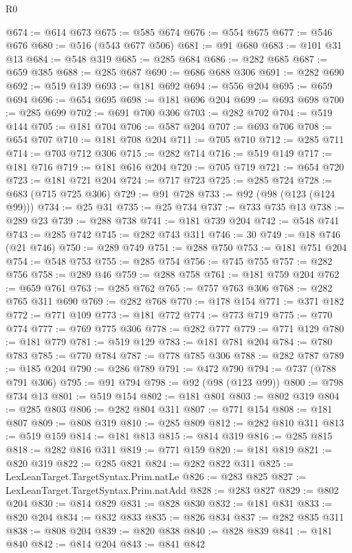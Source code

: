 \begin{lexlean}{R0}
\begin{coremodule}
@674 := @614 @673
@675 := @585 @674
@676 := @554 @675
@677 := @546 @676
@680 := @516 (@543 @677 @506)
@681 := @91 @680
@683 := @101 @31 @13
@684 := @548 @319
@685 := @285 @684
@686 := @282 @685
@687 := @659 @385
@688 := @285 @687
@690 := @686 @688 @306
@691 := @282 @690
@692 := @519 @139
@693 := @181 @692
@694 := @556 @204
@695 := @659 @694
@696 := @654 @695
@698 := @181 @696 @204
@699 := @693 @698
@700 := @285 @699
@702 := @691 @700 @306
@703 := @282 @702
@704 := @519 @144
@705 := @181 @704
@706 := @587 @204
@707 := @693 @706
@708 := @654 @707
@710 := @181 @708 @204
@711 := @705 @710
@712 := @285 @711
@714 := @703 @712 @306
@715 := @282 @714
@716 := @519 @149
@717 := @181 @716
@719 := @181 @616 @204
@720 := @705 @719
@721 := @654 @720
@723 := @181 @721 @204
@724 := @717 @723
@725 := @285 @724
@728 := @683 (@715 @725 @306)
@729 := @91 @728
@733 := @92 (@98 (@123 (@124 @99)))
@734 := @25 @31
@735 := @25 @734
@737 := @733 @735 @13
@738 := @289 @23
@739 := @288 @738
@741 := @181 @739 @204
@742 := @548 @741
@743 := @285 @742
@745 := @282 @743 @311
@746 := 30
@749 := @18 @746 (@21 @746)
@750 := @289 @749
@751 := @288 @750
@753 := @181 @751 @204
@754 := @548 @753
@755 := @285 @754
@756 := @745 @755
@757 := @282 @756
@758 := @289 @46
@759 := @288 @758
@761 := @181 @759 @204
@762 := @659 @761
@763 := @285 @762
@765 := @757 @763 @306
@768 := @282 @765 @311 @690
@769 := @282 @768
@770 := @178 @154
@771 := @371 @182
@772 := @771 @109
@773 := @181 @772
@774 := @773 @719
@775 := @770 @774
@777 := @769 @775 @306
@778 := @282 @777
@779 := @771 @129
@780 := @181 @779
@781 := @519 @129
@783 := @181 @781 @204
@784 := @780 @783
@785 := @770 @784
@787 := @778 @785 @306
@788 := @282 @787
@789 := @185 @204
@790 := @286 @789
@791 := @472 @790
@794 := @737 (@788 @791 @306)
@795 := @91 @794
@798 := @92 (@98 (@123 @99))
@800 := @798 @734 @13
@801 := @519 @154
@802 := @181 @801
@803 := @802 @319
@804 := @285 @803
@806 := @282 @804 @311
@807 := @771 @154
@808 := @181 @807
@809 := @808 @319
@810 := @285 @809
@812 := @282 @810 @311
@813 := @519 @159
@814 := @181 @813
@815 := @814 @319
@816 := @285 @815
@818 := @282 @816 @311
@819 := @771 @159
@820 := @181 @819
@821 := @820 @319
@822 := @285 @821
@824 := @282 @822 @311
@825 := LexLeanTarget.TargetSyntax.Prim.natLe
@826 := @283 @825
@827 := LexLeanTarget.TargetSyntax.Prim.natAdd
@828 := @283 @827
@829 := @802 @204
@830 := @814 @829
@831 := @828 @830
@832 := @181 @831
@833 := @820 @204
@834 := @832 @833
@835 := @826 @834
@837 := @282 @835 @311
@838 := @808 @204
@839 := @820 @838
@840 := @828 @839
@841 := @181 @840
@842 := @814 @204
@843 := @841 @842

\end{coremodule}
\end{lexlean}
